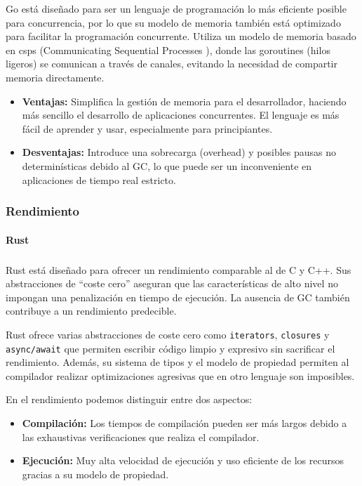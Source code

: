 Go está diseñado para ser un lenguaje de programación lo más eficiente posible para concurrencia, por lo que su modelo de memoria también está optimizado para facilitar la programación concurrente. Utiliza un modelo de memoria basado en \glspl{csp} (Communicating Sequential Processes \cite{communicating-sequential-processes}), donde las goroutines (hilos ligeros) se comunican a través de canales, evitando la necesidad de compartir memoria directamente.
\begin{itemize}
    \item \textbf{Ventajas:} Simplifica la gestión de memoria para el desarrollador, haciendo más sencillo el desarrollo de aplicaciones concurrentes. El lenguaje es más fácil de aprender y usar, especialmente para principiantes.
    \item \textbf{Desventajas:} Introduce una sobrecarga (overhead) y posibles pausas no determinísticas debido al GC, lo que puede ser un inconveniente en aplicaciones de tiempo real estricto.
\end{itemize}

\subsubsection{Rendimiento}
\paragraph{Rust}
\subparagraph{}
Rust está diseñado para ofrecer un rendimiento comparable al de C y C++. Sus abstracciones de ``coste cero'' aseguran que las características de alto nivel no impongan una penalización en tiempo de ejecución. La ausencia de GC también contribuye a un rendimiento predecible.

Rust ofrece varias abstracciones de coste cero como \texttt{iterators}, \texttt{closures} y \texttt{async/await} que permiten escribir código limpio y expresivo sin sacrificar el rendimiento. Además, su sistema de tipos y el modelo de propiedad permiten al compilador realizar optimizaciones agresivas que en otro lenguaje son imposibles.

En el rendimiento podemos distinguir entre dos aspectos:
\begin{itemize}
    \item \textbf{Compilación:} Los tiempos de compilación pueden ser más largos debido a las exhaustivas verificaciones que realiza el compilador.
    \item \textbf{Ejecución:} Muy alta velocidad de ejecución y uso eficiente de los recursos gracias a su modelo de propiedad.
\end{itemize}

